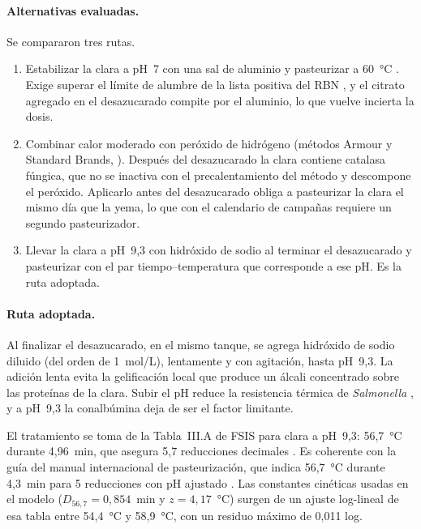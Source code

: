 \paragraph{Alternativas evaluadas.} Se compararon tres rutas.
\begin{enumerate}
  \item Estabilizar la clara a pH~7 con una sal de aluminio y pasteurizar a
        60~°C \parencite{cunningham1965stabilizing,lineweaver1966patent}.
        Exige superar el límite de alumbre de la lista positiva del RBN
        \parencite{rbn1994cap15}, y el citrato agregado en el desazucarado compite
        por el aluminio, lo que vuelve incierta la dosis.
  \item Combinar calor moderado con peróxido de hidrógeno (métodos Armour y Standard
        Brands, \cite[pp.~21--23]{froning2002manual}). Después del desazucarado la clara
        contiene catalasa fúngica, que no se inactiva con el precalentamiento del método
        \parencite{milek2020catalase} y descompone el peróxido. Aplicarlo antes del
        desazucarado obliga a pasteurizar la clara el mismo día que la yema, lo que con
        el calendario de campañas requiere un segundo pasteurizador.
  \item Llevar la clara a pH~9,3 con hidróxido de sodio al terminar el desazucarado y
        pasteurizar con el par tiempo--temperatura que corresponde a ese pH. Es la ruta
        adoptada.
\end{enumerate}

\paragraph{Ruta adoptada.} Al finalizar el desazucarado, en el mismo tanque, se agrega
hidróxido de sodio diluido (del orden de 1~mol/L), lentamente y con
agitación, hasta pH~9,3. La adición lenta evita la gelificación local que produce un
álcali concentrado sobre las proteínas de la clara. Subir el pH reduce la resistencia
térmica de \textit{Salmonella} \parencite[p.~21]{fsis2026guideline}, y a pH~9,3 la
conalbúmina deja de ser el factor limitante.

El tratamiento se toma de la Tabla~III.A de FSIS para clara a pH~9,3:
56,7~°C durante 4,96~min, que asegura 5,7 reducciones decimales
\parencite{fsis2026guideline}. Es coherente con la guía del manual internacional de
pasteurización, que indica 56,7~°C durante 4,3~min para 5
reducciones con pH ajustado \parencite[Tabla~29]{froning2002manual}. Las constantes
cinéticas usadas en el modelo ($D_{56{,}7} = 0{,}854$~min y $z = 4{,}17$~°C)
surgen de un ajuste log-lineal de esa tabla entre 54,4~°C y
58,9~°C, con un residuo máximo de 0,011 log.

